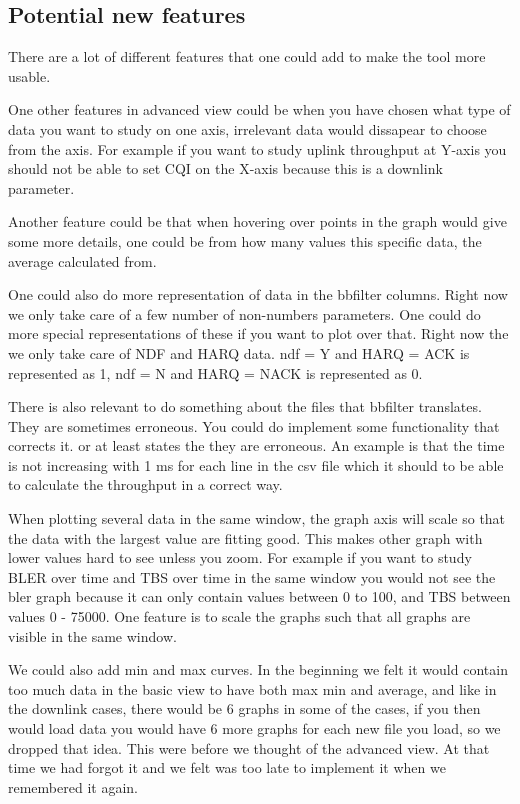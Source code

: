 \documentclass[cropmarks, frame, english]{idamasterthesis}
\begin{document}
\subsection{Potential new features}

There are a lot of different features that one could add to make the tool more usable.


One other features in advanced view could be when you have chosen what type of data you want to study on one axis, irrelevant data would dissapear to choose from the axis. For example if you want to study uplink throughput at Y-axis you should not be able to set CQI on the X-axis because this is a downlink parameter.

Another feature could be that when hovering over points in the graph would give some more details, one could be from how many values this specific data, the average calculated from.

One could also do more representation of data in the bbfilter columns. Right now we only take care of a few number of non-numbers parameters. One could do more special representations of these if you want to plot over that. Right now the we only take care of NDF and HARQ data. ndf = Y and HARQ = ACK is represented as 1, ndf = N and HARQ = NACK is represented as  0.

There is also relevant to do something about the files that bbfilter translates. They are sometimes erroneous. You could do implement some functionality that corrects it. or at least states the they are erroneous. An example is that the time is not increasing with 1 ms for each line in the csv file which it should to be able to calculate the throughput in a correct way.

When plotting several data in the same window, the graph axis will scale so that the data with the largest value are fitting good. This makes other graph with lower values hard to see unless you zoom. For example if you want to study BLER over time and TBS over time in the same window you would not see the bler graph because it can only contain values between 0 to 100, and TBS between values 0 - 75000. One feature is to scale the graphs such that all graphs are visible in the same window.

We could also add min and max curves. In the beginning we felt it would contain too much data in the basic view to have both max min and average, and like in the downlink cases, there would be 6 graphs in some of the cases, if you then would load data you would have 6 more graphs for each new file you load, so we dropped that idea. This were before we thought of the advanced view. At that time we had forgot it and we felt was too late to implement it when we remembered it again.
\end{document}
